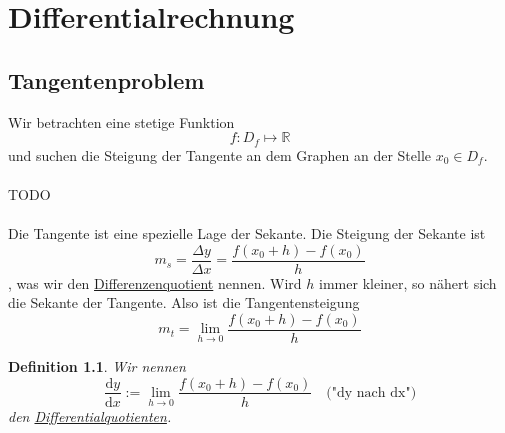 \documentclass[a4paper,10pt]{report}
\newtheorem{mydef}{Definition}
\begin{document}
\chapter{Differentialrechnung}
\section{Tangentenproblem}
Wir betrachten eine stetige Funktion
\begin{equation*}f: D_f \mapsto \mathbb{R}\end{equation*}
und suchen die Steigung der Tangente an dem Graphen an der Stelle $x_0 \in D_f$.
\\\\TODO\\\\
Die Tangente ist eine spezielle Lage der Sekante. Die Steigung der Sekante ist
\begin{equation*}m_s = \frac{\Delta y}{\Delta x} = \frac{f(x_0 + h) - f(x_0)}{h}\end{equation*}
, was wir den \underline{Differenzenquotient} nennen. Wird $h$ immer kleiner, so nähert sich die Sekante der Tangente. Also ist die Tangentensteigung
\begin{equation*}m_t = \lim_{h \to 0} \frac{f(x_0 + h) - f(x_0)}{h}\end{equation*}
\begin{mydef}Wir nennen
\begin{equation*}\frac{\mathrm{d}y}{\mathrm{d}x} := \lim_{h \to 0} \frac{f(x_0 + h) - f(x_0)}{h} \quad \mbox{("dy nach dx")}\end{equation*}
den \underline{Differentialquotienten}.\end{mydef}
\end{document}
